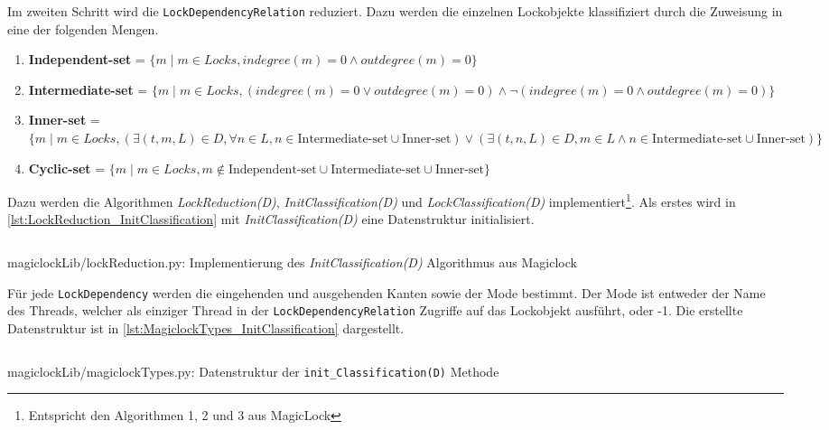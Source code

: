 Im zweiten Schritt wird die \texttt{LockDependencyRelation} reduziert. Dazu
werden die einzelnen Lockobjekte klassifiziert durch die Zuweisung in eine der
folgenden Mengen\autocite[4]{MagicLock}.
\begin{enumerate}
  \item \textbf{Independent-set} = $\{m \mid m \in Locks, indegree(m) = 0 \land
  outdegree(m) = 0\}$
  \item \textbf{Intermediate-set} = $\{m \mid m \in Locks, (indegree(m) = 0 \lor
  outdegree(m) = 0) \land \lnot (indegree(m) = 0 \land outdegree(m) = 0)\}$
  \item \textbf{Inner-set} = $\{m \mid m \in Locks, (\exists (t,m,L) \in D,
  \forall n \in L, n \in \text{Intermediate-set} \cup \text{Inner-set}) \lor
  (\exists (t,n,L) \in D, m \in L \land n \in \text{Intermediate-set} \cup
  \text{Inner-set})\}$
  \item \textbf{Cyclic-set} = $\{m \mid m \in Locks, m \notin
  \text{Independent-set} \cup \text{Intermediate-set} \cup \text{Inner-set}\}$
\end{enumerate}
Dazu werden die Algorithmen \emph{LockReduction(D)},
\emph{InitClassification(D)} und \emph{LockClassification(D)}
implementiert\footnote{Entspricht den Algorithmen 1, 2 und 3 aus
MagicLock\autocite[5]{MagicLock}}. Als erstes wird in
\cref{lst:LockReduction_InitClassification} mit \emph{InitClassification(D)}
eine Datenstruktur initialisiert.
\begin{listing}[ht]
  \inputminted[frame=lines,linenos,firstline=17,lastline=32]{python}{./Python/magiclockLib/lockReduction.py}
  \caption{magiclockLib/lockReduction.py: Implementierung des \emph{InitClassification(D)} Algorithmus aus Magiclock\autocite[5]{MagicLock}}
  \label{lst:LockReduction_InitClassification}
\end{listing}
Für jede \texttt{LockDependency} werden die eingehenden und ausgehenden Kanten
sowie der Mode bestimmt. Der Mode ist entweder der Name des Threads, welcher als
einziger Thread in der \texttt{LockDependencyRelation} Zugriffe auf das
Lockobjekt ausführt, oder -1. Die erstellte Datenstruktur ist in
\cref{lst:MagiclockTypes_InitClassification} dargestellt.
\begin{listing}[ht]
  \inputminted[frame=lines,linenos,firstline=3,lastline=8]{python}{./Python/magiclockLib/magiclockTypes.py}
  \caption{magiclockLib/magiclockTypes.py: Datenstruktur der \texttt{init\_Classification(D)} Methode}
  \label{lst:MagiclockTypes_InitClassification}
\end{listing}
